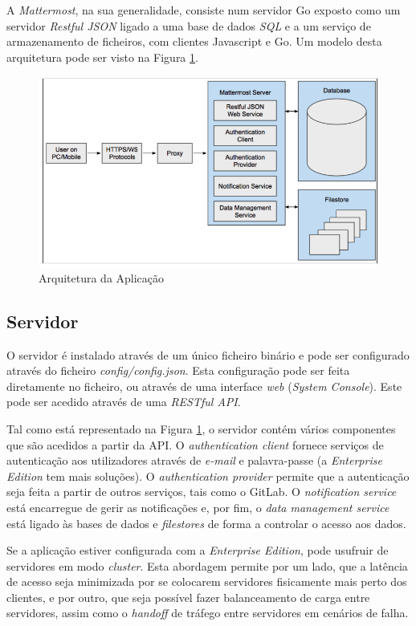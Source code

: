 A \textit{Mattermost}, na sua generalidade, consiste num servidor Go exposto como um servidor \textit{Restful JSON} ligado a uma base de dados \textit{SQL} e a um serviço de armazenamento de ficheiros, com clientes Javascript e Go. Um modelo desta arquitetura pode ser visto na Figura \ref{fig:architecture_with_protocol}.
\par

\begin{figure}[H]
    \centering
    \includegraphics[width=\textwidth]{diagramas/architecture_with_protocol.png}
    \caption{Arquitetura da Aplicação \cite{architecture_communication}}
    \label{fig:architecture_with_protocol}
\end{figure}


\subsection{Servidor}
O servidor é instalado através de um único ficheiro binário e pode ser configurado através do ficheiro \textit{config/config.json}. Esta configuração pode ser feita diretamente no ficheiro, ou através de uma interface \textit{web} (\textit{System Console}). Este pode ser acedido através de uma \textit{RESTful API}.\par
Tal como está representado na Figura \ref{fig:architecture_with_protocol}, o servidor contém vários componentes que são acedidos a partir da API. O \textit{authentication client} fornece serviços de autenticação aos utilizadores através de \textit{e-mail} e palavra-passe (a \textit{Enterprise Edition} tem mais soluções). O \textit{authentication provider} permite que a autenticação seja feita a partir de outros serviços, tais como o GitLab. O \textit{notification service} está encarregue de gerir as notificações e, por fim, o \textit{data management service} está ligado às bases de dados e \textit{filestores} de forma a controlar o acesso aos dados.\par
Se a aplicação estiver configurada com a \textit{Enterprise Edition}, pode usufruir de servidores em modo \textit{cluster}. Esta abordagem permite por um lado, que a latência de acesso seja minimizada por se colocarem servidores fisicamente mais perto dos clientes, e por outro, que seja possível fazer balanceamento de carga entre servidores, assim como o \textit{handoff} de tráfego entre servidores em cenários de falha. \cite{deployment_server}
\par


